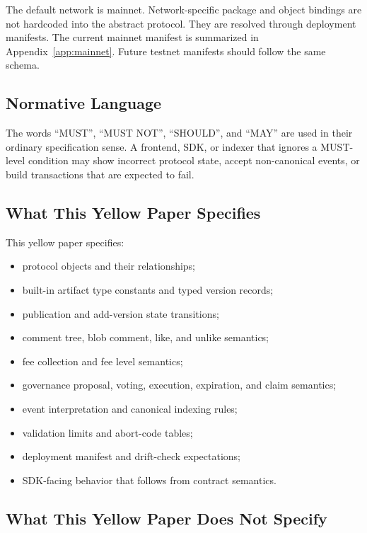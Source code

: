 \documentclass[11pt]{article}
\begin{document}
The default network is mainnet. Network-specific package and object bindings are not hardcoded into the abstract protocol. They are resolved through deployment manifests. The current mainnet manifest is summarized in Appendix~\ref{app:mainnet}. Future testnet manifests should follow the same schema.

\subsection{Normative Language}

The words ``MUST'', ``MUST NOT'', ``SHOULD'', and ``MAY'' are used in their ordinary specification sense. A frontend, SDK, or indexer that ignores a MUST-level condition may show incorrect protocol state, accept non-canonical events, or build transactions that are expected to fail.

\subsection{What This Yellow Paper Specifies}

This yellow paper specifies:

\begin{itemize}[leftmargin=*]
  \item protocol objects and their relationships;
  \item built-in artifact type constants and typed version records;
  \item publication and add-version state transitions;
  \item comment tree, blob comment, like, and unlike semantics;
  \item fee collection and fee level semantics;
  \item governance proposal, voting, execution, expiration, and claim semantics;
  \item event interpretation and canonical indexing rules;
  \item validation limits and abort-code tables;
  \item deployment manifest and drift-check expectations;
  \item SDK-facing behavior that follows from contract semantics.
\end{itemize}

\subsection{What This Yellow Paper Does Not Specify}
\end{document}
